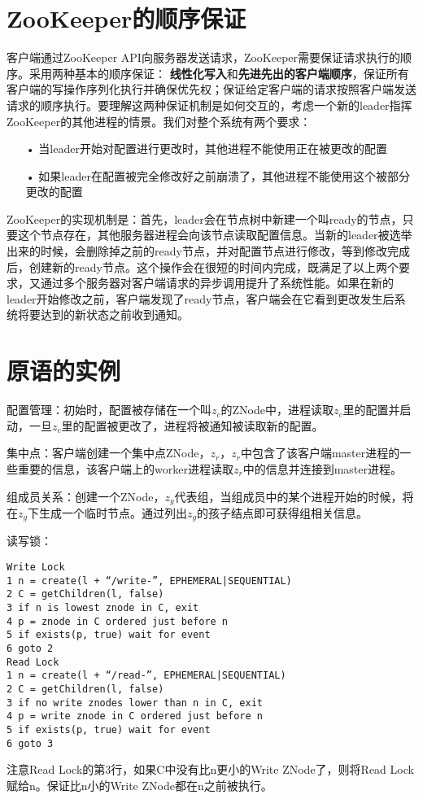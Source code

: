 \documentclass[UTF8]{article}
\begin{document}
\section{ZooKeeper的顺序保证}
客户端通过ZooKeeper API向服务器发送请求，ZooKeeper需要保证请求执行的顺序。采用两种基本的顺序保证：
\textbf{线性化写入}和\textbf{先进先出的客户端顺序}，保证所有客户端的写操作序列化执行并确保优先权；保证给定客户端的请求按照客户端发送请求的顺序执行。要理解这两种保证机制是如何交互的，考虑一个新的leader指挥ZooKeeper的其他进程的情景。我们对整个系统有两个要求：
\begin{itemize}
	\item[•] 当leader开始对配置进行更改时，其他进程不能使用正在被更改的配置
	\item[•] 如果leader在配置被完全修改好之前崩溃了，其他进程不能使用这个被部分更改的配置
\end{itemize}
ZooKeeper的实现机制是：首先，leader会在节点树中新建一个叫ready的节点，只要这个节点存在，其他服务器进程会向该节点读取配置信息。当新的leader被选举出来的时候，会删除掉之前的ready节点，并对配置节点进行修改，等到修改完成后，创建新的ready节点。这个操作会在很短的时间内完成，既满足了以上两个要求，又通过多个服务器对客户端请求的异步调用提升了系统性能。如果在新的leader开始修改之前，客户端发现了ready节点，客户端会在它看到更改发生后系统将要达到的新状态之前收到通知。

\section{原语的实例}
配置管理：初始时，配置被存储在一个叫$ z_c $的ZNode中，进程读取$ z_c $里的配置并启动，一旦$ z_c $里的配置被更改了，进程将被通知被读取新的配置。

集中点：客户端创建一个集中点ZNode，$ z_r $，$ z_r $中包含了该客户端master进程的一些重要的信息，该客户端上的worker进程读取$ z_r $中的信息并连接到master进程。

组成员关系：创建一个ZNode，$ z_g $代表组，当组成员中的某个进程开始的时候，将在$ z_g $下生成一个临时节点。通过列出$ z_g $的孩子结点即可获得组相关信息。

读写锁：
\begin{lstlisting}[frame=shadowbox]
Write Lock
1 n = create(l + “/write-”, EPHEMERAL|SEQUENTIAL)
2 C = getChildren(l, false)
3 if n is lowest znode in C, exit
4 p = znode in C ordered just before n
5 if exists(p, true) wait for event
6 goto 2
Read Lock
1 n = create(l + “/read-”, EPHEMERAL|SEQUENTIAL)
2 C = getChildren(l, false)
3 if no write znodes lower than n in C, exit
4 p = write znode in C ordered just before n
5 if exists(p, true) wait for event
6 goto 3
\end{lstlisting}
注意Read Lock的第3行，如果C中没有比n更小的Write ZNode了，则将Read Lock赋给n。保证比n小的Write ZNode都在n之前被执行。
\end{document}
